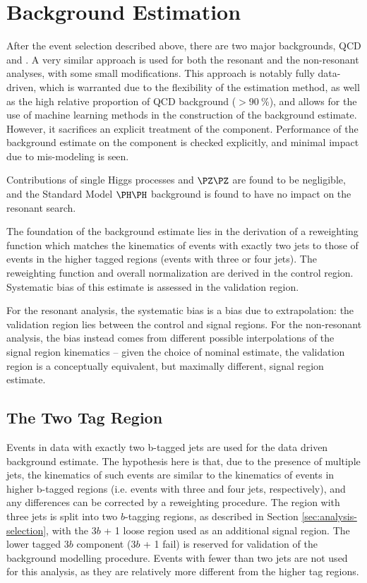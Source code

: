 \chapter{Background Estimation}
\label{chap:bbbb-background}

After the event selection described above, there are
two major backgrounds, QCD and \ttbar. A very similar approach is used 
for both the resonant and the non-resonant analyses, with some small modifications. 
This approach is notably fully data-driven, which is warranted due to 
the flexibility of the estimation method, as well as the high relative proportion of 
QCD background ($>90~\%$), and allows for the use of machine learning methods in the construction of
the background estimate. However, it sacrifices an explicit treatment of the
\ttbar component. Performance of the background estimate on the \ttbar component
is checked explicitly, and minimal impact due to \ttbar 
mis-modeling is seen.

Contributions of single Higgs processes and $\PZ\PZ$ are found 
to be negligible, and the Standard Model $\higgs\higgs$ background
is found to have no impact on the resonant search.

The foundation of the background estimate lies in the derivation of a
reweighting function which matches the kinematics of events with exactly two
\btagged jets to those of events in the higher tagged regions (events with three or four 
\btagged jets). The reweighting function and overall normalization are derived in 
the control region. Systematic bias of this estimate is assessed in the validation 
region. 

For the resonant analysis, the systematic bias is a bias due to extrapolation:
the validation region lies between the control and signal regions. For the 
non-resonant analysis, the bias instead comes from different possible interpolations
of the signal region kinematics -- given the choice of nominal estimate, the validation
region is a conceptually equivalent, but maximally different, signal region estimate.

\section{The Two Tag Region}

Events in data with exactly two b-tagged jets are used for the data driven 
background estimate. The hypothesis here is that, due to the presence of 
multiple \btagged jets, the kinematics of such events are similar to the 
kinematics of events in higher b-tagged regions (i.e. events with three and 
four \btagged jets, respectively), and any differences can be corrected by a 
reweighting procedure. The region with three \btagged jets is split into 
two $b$-tagging regions, as described in Section \ref{sec:analysis-selection}, 
with the 3$b$ + 1 loose region used as an additional signal 
region. The lower tagged 3$b$ component (3$b$ + 1 fail) is reserved for validation
of the background modelling procedure. Events with fewer than two \btagged jets are not 
used for this analysis, as they are relatively more different from the higher tag regions.


